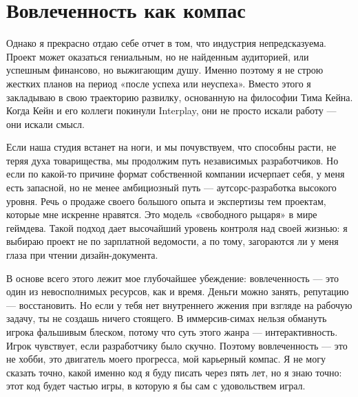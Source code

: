 \documentclass[14pt,a4paper]{extarticle}
\begin{document}
\section{ Вовлеченность как компас }

Однако я прекрасно отдаю себе отчет в том, что индустрия непредсказуема. Проект
может оказаться гениальным, но не найденным аудиторией, или успешным финансово,
но выжигающим душу. Именно поэтому я не строю жестких планов на период «после
успеха или неуспеха». Вместо этого я закладываю в свою траекторию развилку,
основанную на философии Тима Кейна. Когда Кейн и его коллеги покинули
Interplay, они не просто искали работу — они искали смысл.

Если наша студия встанет на ноги, и мы почувствуем, что способны расти, не
теряя духа товарищества, мы продолжим путь независимых разработчиков. Но если
по какой-то причине формат собственной компании исчерпает себя, у меня есть
запасной, но не менее амбициозный путь — аутсорс-разработка высокого уровня.
Речь о продаже своего большого опыта и экспертизы тем проектам, которые мне
искренне нравятся. Это модель «свободного рыцаря» в мире геймдева. Такой подход
дает высочайший уровень контроля над своей жизнью: я выбираю проект не по
зарплатной ведомости, а по тому, загораются ли у меня глаза при чтении
дизайн-документа.

В основе всего этого лежит мое глубочайшее убеждение: вовлеченность — это один
из невосполнимых ресурсов, как и время. Деньги можно занять, репутацию —
восстановить. Но если у тебя нет внутреннего жжения при взгляде на рабочую
задачу, ты не создашь ничего стоящего. В иммерсив-симах нельзя обмануть игрока
фальшивым блеском, потому что суть этого жанра — интерактивность. Игрок
чувствует, если разработчику было скучно. Поэтому вовлеченность — это не хобби,
это двигатель моего прогресса, мой карьерный компас. Я не могу сказать точно,
какой именно код я буду писать через пять лет, но я знаю точно: этот код будет
частью игры, в которую я бы сам с удовольствем играл.
\end{document}
